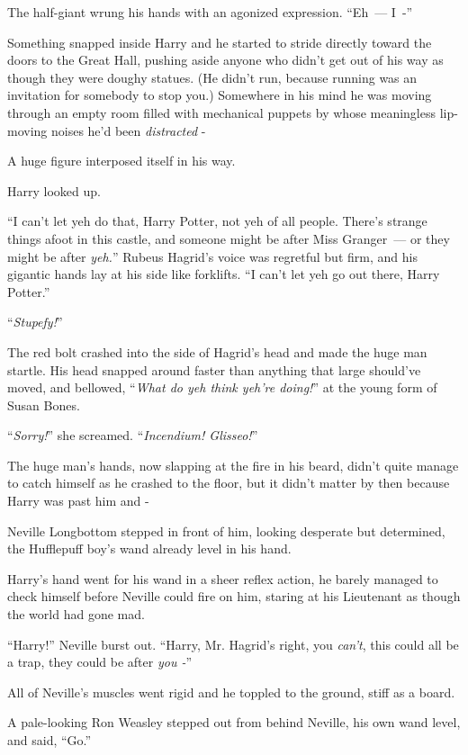 The half-giant wrung his hands with an agonized expression. ``Eh~--- I~-''

Something snapped inside Harry and he started to stride directly toward the doors to the Great Hall, pushing aside anyone who didn't get out of his way as though they were doughy statues. (He didn't run, because running was an invitation for somebody to stop you.) Somewhere in his mind he was moving through an empty room filled with mechanical puppets by whose meaningless lip-moving noises he'd been \emph{distracted} -

A huge figure interposed itself in his way.

Harry looked up.

``I can't let yeh do that, Harry Potter, not yeh of all people. There's strange things afoot in this castle, and someone might be after Miss Granger~--- or they might be after \emph{yeh.}'' Rubeus Hagrid's voice was regretful but firm, and his gigantic hands lay at his side like forklifts. ``I can't let yeh go out there, Harry Potter.''

``\emph{Stupefy!}''

The red bolt crashed into the side of Hagrid's head and made the huge man startle. His head snapped around faster than anything that large should've moved, and bellowed, ``\emph{What do yeh think yeh're doing!}'' at the young form of Susan Bones.

``\emph{Sorry!}'' she screamed. ``\emph{Incendium! Glisseo!}''

The huge man's hands, now slapping at the fire in his beard, didn't quite manage to catch himself as he crashed to the floor, but it didn't matter by then because Harry was past him and -

Neville Longbottom stepped in front of him, looking desperate but determined, the Hufflepuff boy's wand already level in his hand.

Harry's hand went for his wand in a sheer reflex action, he barely managed to check himself before Neville could fire on him, staring at his Lieutenant as though the world had gone mad.

``Harry!'' Neville burst out. ``Harry, Mr. Hagrid's right, you \emph{can't}, this could all be a trap, they could be after \emph{you -}''

All of Neville's muscles went rigid and he toppled to the ground, stiff as a board.

A pale-looking Ron Weasley stepped out from behind Neville, his own wand level, and said, ``Go.''

